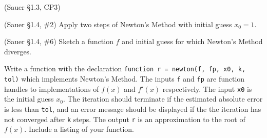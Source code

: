 \documentclass[12pt,fleqn]{exam}
\begin{document}
\begin{questions}

\question (Sauer \S1.3, CP3)


\question (Sauer \S1.4, \#2) Apply two steps of Newton's Method with initial guess $x_0 = 1$.


\question (Sauer \S1.4, \#6) Sketch a function $f$ and initial guess for which Newton's Method diverges.

\question Write a function with the declaration \verb$function r = newton(f, fp, x0, k, tol)$ which implements Newton's Method. The inputs \verb$f$ and \verb$fp$ are function handles to implementations of $f(x)$ and $f'(x)$ respectively. The input \verb$x0$ is the initial guess $x_0$. The iteration should terminate if the estimated absolute error is less than \verb$tol$, and an error message should be displayed if the the iteration has not converged after \verb$k$ steps. The output \verb$r$ is an approximation to the root of $f(x)$. Include a listing of your function.


\end{questions}
\end{document}

